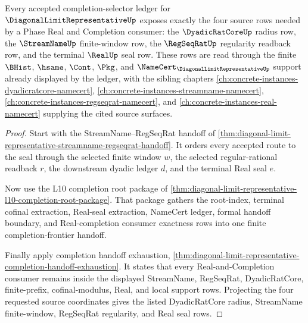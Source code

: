 \begin{theorem}
\label{thm:diagonal-limit-representative-four-object-source-exhaustion}
Every accepted completion-selector ledger for $\DiagonalLimitRepresentativeUp$ exposes exactly the four source rows needed by a Phase Real and Completion consumer: the $\DyadicRatCoreUp$ radius row, the $\StreamNameUp$ finite-window row, the $\RegSeqRatUp$ regularity readback row, and the terminal $\RealUp$ seal row. These rows are read through the finite $\BHist$, $\hsame$, $\Cont$, $\Pkg$, and $\NameCert_{\DiagonalLimitRepresentativeUp}$ support already displayed by the ledger, with the sibling chapters \autoref{ch:concrete-instances-dyadicratcore-namecert}, \autoref{ch:concrete-instances-streamname-namecert}, \autoref{ch:concrete-instances-regseqrat-namecert}, and \autoref{ch:concrete-instances-real-namecert} supplying the cited source surfaces.
\end{theorem}
\begin{proof}
Start with the StreamName--RegSeqRat handoff of \autoref{thm:diagonal-limit-representative-streamname-regseqrat-handoff}. It orders every accepted route to the seal through the selected finite window $w$, the selected regular-rational readback $r$, the downstream dyadic ledger $d$, and the terminal Real seal $e$.

Now use the L10 completion root package of \autoref{thm:diagonal-limit-representative-l10-completion-root-package}. That package gathers the root-index, terminal cofinal extraction, Real-seal extraction, NameCert ledger, formal handoff boundary, and Real-completion consumer exactness rows into one finite completion-frontier handoff.

Finally apply completion handoff exhaustion, \autoref{thm:diagonal-limit-representative-completion-handoff-exhaustion}. It states that every Real-and-Completion consumer remains inside the displayed StreamName, RegSeqRat, DyadicRatCore, finite-prefix, cofinal-modulus, Real, and local support rows. Projecting the four requested source coordinates gives the listed DyadicRatCore radius, StreamName finite-window, RegSeqRat regularity, and Real seal rows.
\end{proof}

